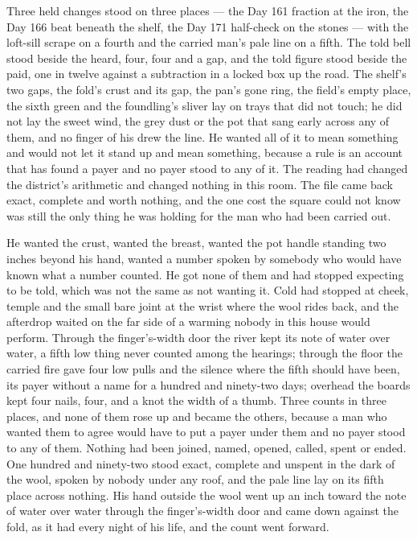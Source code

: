 Three held changes stood on three places --- the Day 161 fraction at the iron, the Day 166 beat beneath the shelf, the Day 171 half-check on the stones --- with the loft-sill scrape on a fourth and the carried man's pale line on a fifth. The told bell stood beside the heard, four, four and a gap, and the told figure stood beside the paid, one in twelve against a subtraction in a locked box up the road. The shelf's two gaps, the fold's crust and its gap, the pan's gone ring, the field's empty place, the sixth green and the foundling's sliver lay on trays that did not touch; he did not lay the sweet wind, the grey dust or the pot that sang early across any of them, and no finger of his drew the line. He wanted all of it to mean something and would not let it stand up and mean something, because a rule is an account that has found a payer and no payer stood to any of it. The reading had changed the district's arithmetic and changed nothing in this room. The file came back exact, complete and worth nothing, and the one cost the square could not know was still the only thing he was holding for the man who had been carried out.

He wanted the crust, wanted the breast, wanted the pot handle standing two inches beyond his hand, wanted a number spoken by somebody who would have known what a number counted. He got none of them and had stopped expecting to be told, which was not the same as not wanting it. Cold had stopped at cheek, temple and the small bare joint at the wrist where the wool rides back, and the afterdrop waited on the far side of a warming nobody in this house would perform. Through the finger's-width door the river kept its note of water over water, a fifth low thing never counted among the hearings; through the floor the carried fire gave four low pulls and the silence where the fifth should have been, its payer without a name for a hundred and ninety-two days; overhead the boards kept four nails, four, and a knot the width of a thumb. Three counts in three places, and none of them rose up and became the others, because a man who wanted them to agree would have to put a payer under them and no payer stood to any of them. Nothing had been joined, named, opened, called, spent or ended. One hundred and ninety-two stood exact, complete and unspent in the dark of the wool, spoken by nobody under any roof, and the pale line lay on its fifth place across nothing. His hand outside the wool went up an inch toward the note of water over water through the finger's-width door and came down against the fold, as it had every night of his life, and the count went forward.
